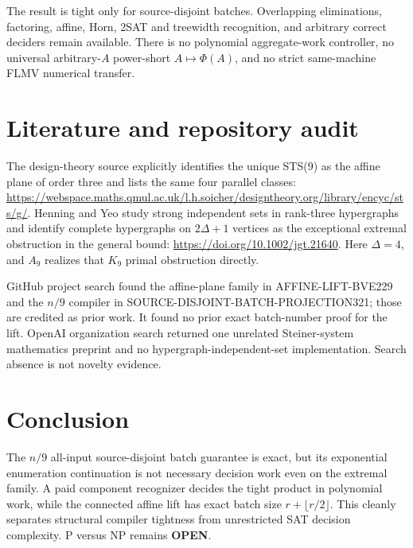 \documentclass[11pt]{article}
\begin{document}
The result is tight only for source-disjoint batches.  Overlapping
eliminations, factoring, affine, Horn, 2SAT and treewidth recognition, and
arbitrary correct deciders remain available.  There is no polynomial aggregate-work
controller, no universal arbitrary-$A$ power-short $A\mapsto\Phi(A)$, and no
strict same-machine FLMV numerical transfer.

\section{Literature and repository audit}

The design-theory source explicitly identifies the unique STS(9) as the
affine plane of order three and lists the same four parallel classes:
\url{https://webspace.maths.qmul.ac.uk/l.h.soicher/designtheory.org/library/encyc/sts/g/}.
Henning and Yeo study strong independent sets in rank-three hypergraphs and
identify complete hypergraphs on $2\Delta+1$ vertices as the exceptional
extremal obstruction in the general bound:
\url{https://doi.org/10.1002/jgt.21640}.  Here $\Delta=4$, and $A_9$ realizes
that $K_9$ primal obstruction directly.

GitHub project search found the affine-plane family in AFFINE-LIFT-BVE229 and
the $n/9$ compiler in SOURCE-DISJOINT-BATCH-PROJECTION321; those are credited
as prior work.  It found no prior exact batch-number proof for the lift.
OpenAI organization search returned one unrelated Steiner-system mathematics
preprint and no hypergraph-independent-set implementation.  Search absence is
not novelty evidence.

\section{Conclusion}

The $n/9$ all-input source-disjoint batch guarantee is exact, but its
exponential enumeration continuation is not necessary decision work even on
the extremal family.  A paid component recognizer decides the tight product in
polynomial work, while the connected affine lift has exact batch size
$r+\lfloor r/2\rfloor$.  This cleanly separates structural compiler tightness
from unrestricted SAT decision complexity.  P versus NP remains
\textbf{OPEN}.
\end{document}
